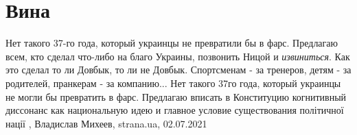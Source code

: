  
 
 
 
 
\chapter{Вина}
\label{sec:slova.vina}

Нет такого 37-го года, который украинцы не превратили бы в фарс.  Предлагаю
всем, кто сделал что-либо на благо Украины, позвонить Ницой и \emph{извиниться}. Как
это сделал то ли Довбык, то ли не Довбык.  Спортсменам - за тренеров, детям -
за родителей, пранкерам - за компанию...  Нет такого 37го года, который
украинцы не могли бы превратить в фарс.  Предлагаю вписать в Конституцию
когнитивный диссонанс как национальную идею и главное условие существования
політичної нації
, 
Владислав Михеев, strana.ua, 02.07.2021

